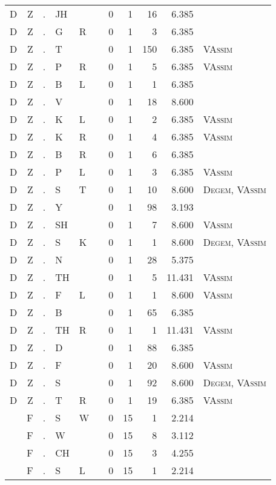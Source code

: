 \begin{longtable}{r@{ } r@{ } c@{ } l@{ } l@{ } l@{ } r r r r l }
D & Z & . & JH &  &  & 0 & 1 & 16 & 6.385 &  \\
D & Z & . & G & R &  & 0 & 1 & 3 & 6.385 &  \\
D & Z & . & T &  &  & 0 & 1 & 150 & 6.385 & \textsc{VAssim} \\
D & Z & . & P & R &  & 0 & 1 & 5 & 6.385 & \textsc{VAssim} \\
D & Z & . & B & L &  & 0 & 1 & 1 & 6.385 &  \\
D & Z & . & V &  &  & 0 & 1 & 18 & 8.600 &  \\
D & Z & . & K & L &  & 0 & 1 & 2 & 6.385 & \textsc{VAssim} \\
D & Z & . & K & R &  & 0 & 1 & 4 & 6.385 & \textsc{VAssim} \\
D & Z & . & B & R &  & 0 & 1 & 6 & 6.385 &  \\
D & Z & . & P & L &  & 0 & 1 & 3 & 6.385 & \textsc{VAssim} \\
D & Z & . & S & T &  & 0 & 1 & 10 & 8.600 & \textsc{Degem}, \textsc{VAssim} \\
D & Z & . & Y &  &  & 0 & 1 & 98 & 3.193 &  \\
D & Z & . & SH &  &  & 0 & 1 & 7 & 8.600 & \textsc{VAssim} \\
D & Z & . & S & K &  & 0 & 1 & 1 & 8.600 & \textsc{Degem}, \textsc{VAssim} \\
D & Z & . & N &  &  & 0 & 1 & 28 & 5.375 &  \\
D & Z & . & TH &  &  & 0 & 1 & 5 & 11.431 & \textsc{VAssim} \\
D & Z & . & F & L &  & 0 & 1 & 1 & 8.600 & \textsc{VAssim} \\
D & Z & . & B &  &  & 0 & 1 & 65 & 6.385 &  \\
D & Z & . & TH & R &  & 0 & 1 & 1 & 11.431 & \textsc{VAssim} \\
D & Z & . & D &  &  & 0 & 1 & 88 & 6.385 &  \\
D & Z & . & F &  &  & 0 & 1 & 20 & 8.600 & \textsc{VAssim} \\
D & Z & . & S &  &  & 0 & 1 & 92 & 8.600 & \textsc{Degem}, \textsc{VAssim} \\
D & Z & . & T & R &  & 0 & 1 & 19 & 6.385 & \textsc{VAssim} \\
 & F & . & S & W &  & 0 & 15 & 1 & 2.214 &  \\
 & F & . & W &  &  & 0 & 15 & 8 & 3.112 &  \\
 & F & . & CH &  &  & 0 & 15 & 3 & 4.255 &  \\
 & F & . & S & L &  & 0 & 15 & 1 & 2.214 &  \\

\end{longtable}
